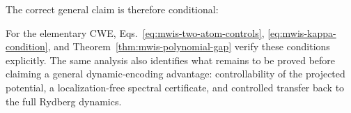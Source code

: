 The correct general claim is therefore conditional:
\begin{center}
\end{center}

For the elementary CWE, Eqs.~\eqref{eq:mwis-two-atom-controls},
\eqref{eq:mwis-kappa-condition}, and
Theorem~\ref{thm:mwis-polynomial-gap} verify these conditions explicitly.  The
same analysis also identifies what remains to be proved before claiming a
general dynamic-encoding advantage: controllability of the projected
potential, a localization-free spectral certificate, and controlled transfer
back to the full Rydberg dynamics.
